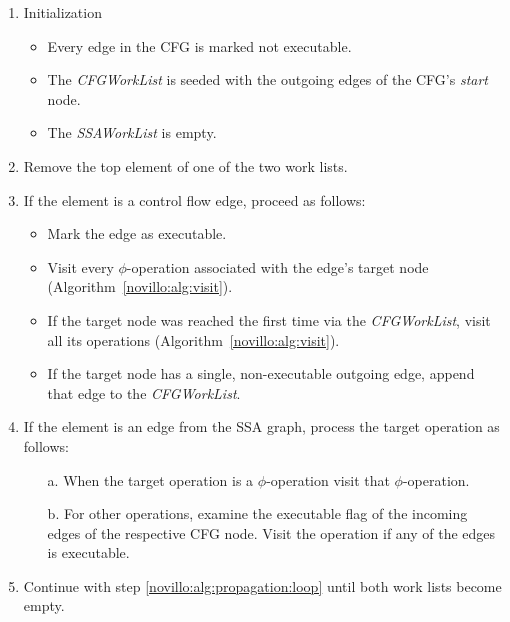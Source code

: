 \begin{algorithm}[t!]
  \begin{enumerate}
    \item Initialization
          \begin{itemize}
            \vspace{-1.2ex}
            \item Every edge in the CFG is marked not executable.
            \item The \emph{CFGWorkList} is seeded with the outgoing edges
                  of the CFG's \emph{start} node.
            \item The \emph{SSAWorkList} is empty.
          \end{itemize}
          \vspace{-1ex}
    \item \label{novillo:alg:propagation:loop} Remove the top element of one
          of the two work lists.
    \item \label{novillo:alg:propagation:flowedge} If the element is a control
          flow edge, proceed as follows:
          \begin{itemize}
            \vspace{-1.2ex}
            \item Mark the edge as executable.
            \item Visit every $\phi$-operation associated with the edge's target
                  node (Algorithm~\ref{novillo:alg:visit}).
            \item If the target node was reached the first time via the
                  \emph{CFGWorkList}, visit all its operations (Algorithm~\ref{novillo:alg:visit}).
            \item If the target node has a single, non-executable outgoing
                  edge, append that edge to the \emph{CFGWorkList}.
          \end{itemize}
          \vspace{-1ex}
    \item \label{novillo:alg:propagation:ssaedge} If the element is an edge from
          the SSA graph, process the target operation as follows:
          \begin{enumerate}
            \vspace{-1.2ex}
            \item[a.] When the target operation is a $\phi$-operation visit that
                      $\phi$-operation.
            \item[b.] \label{novillo:alg:propagation:ssaedge:regular} For other
                      operations, examine the executable flag of the incoming
                      edges of the respective CFG node. Visit the operation
                      if any of the edges is executable.
          \end{enumerate}
          \vspace{-1ex}
    \item Continue with step \ref{novillo:alg:propagation:loop} until both work
          lists become empty.
  \end{enumerate}


\end{algorithm}
